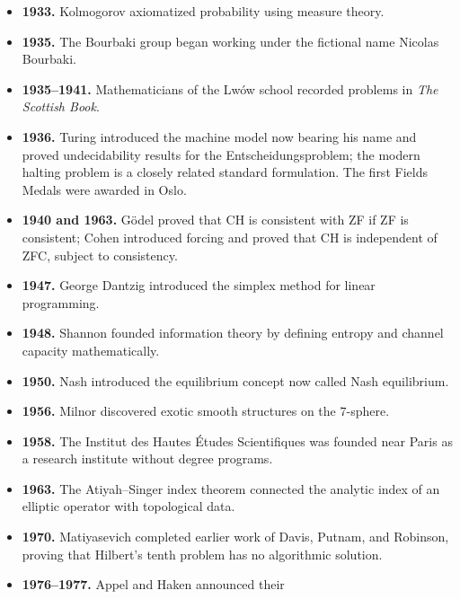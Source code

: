 \begin{itemize}
              sufficiently strong consistent effectively axiomatized formal
              system is incomplete and cannot prove its own consistency.
        \item \textbf{1933.} Kolmogorov axiomatized probability using measure
              theory.
        \item \textbf{1935.} The Bourbaki group began working under the
              fictional name Nicolas Bourbaki.
        \item \textbf{1935--1941.} Mathematicians of the Lwów school recorded
              problems in \textit{The Scottish Book}.
        \item \textbf{1936.} Turing introduced the machine model now bearing
              his name and proved undecidability results for the
              Entscheidungsproblem; the modern halting problem is a closely
              related standard formulation.
              The first Fields Medals were awarded in Oslo.
        \item \textbf{1940 and 1963.} Gödel proved that CH is consistent with
              ZF if ZF is consistent; Cohen introduced forcing and proved that
              CH is independent of ZFC, subject to consistency.
        \item \textbf{1947.} George Dantzig introduced the simplex method for
              linear programming.
        \item \textbf{1948.} Shannon founded information theory by defining
              entropy and channel capacity mathematically.
        \item \textbf{1950.} Nash introduced the equilibrium concept now called
              Nash equilibrium.
        \item \textbf{1956.} Milnor discovered exotic smooth structures on the
              $7$-sphere.
        \item \textbf{1958.} The Institut des Hautes Études Scientifiques was
              founded near Paris as a research institute without degree
              programs.
        \item \textbf{1963.} The Atiyah--Singer index theorem connected the
              analytic index of an elliptic operator with topological data.
        \item \textbf{1970.} Matiyasevich completed earlier work of Davis,
              Putnam, and Robinson, proving that Hilbert's tenth problem has
              no algorithmic solution.
        \item \textbf{1976--1977.} Appel and Haken announced their

\end{itemize}

